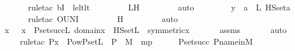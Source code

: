 \begin{isabellebody}
\ \ \ \ \ \ \isamarkupfalse%
{\isacharparenleft}{\kern0pt}rule{\isacharunderscore}{\kern0pt}tac\ b{\isacharequal}{\kern0pt}{\isachardoublequoteopen}{\isasymUnion}I{\isachardoublequoteclose}\ \ le{\isacharunderscore}{\kern0pt}lt{\isacharunderscore}{\kern0pt}lt{\isacharparenright}{\kern0pt}\ \isanewline
\ \ \ \ \ \ \isamarkupfalse%
\ LH\ \isanewline
\ \ \ \ \ \ \isamarkupfalse%
\ auto\ \isanewline
\ \ \ \ \isamarkupfalse%
\ \isamarkupfalse%
\ {\isachardoublequoteopen}y\ {\isasymin}\ {\isacharparenleft}{\kern0pt}{\isasymUnion}a\ {\isacharless}{\kern0pt}\ L{\isachardot}{\kern0pt}\ HS{\isacharunderscore}{\kern0pt}set{\isacharparenleft}{\kern0pt}a{\isacharparenright}{\kern0pt}{\isacharparenright}{\kern0pt}{\isachardoublequoteclose}\isanewline
\ \ \ \ \ \ \isamarkupfalse%
{\isacharparenleft}{\kern0pt}rule{\isacharunderscore}{\kern0pt}tac\ OUN{\isacharunderscore}{\kern0pt}I{\isacharparenright}{\kern0pt}\ \isanewline
\ \ \ \ \ \ \isamarkupfalse%
\ H\ \isanewline
\ \ \ \ \ \ \isamarkupfalse%
\ auto\isanewline
\ \ \isamarkupfalse%
\isanewline
\ \ \isamarkupfalse%
\ \isamarkupfalse%
\ {\isachardoublequoteopen}x\ {\isasymin}\ {\isacharbraceleft}{\kern0pt}\ x\ {\isasymin}\ P{\isacharunderscore}{\kern0pt}set{\isacharparenleft}{\kern0pt}succ{\isacharparenleft}{\kern0pt}L{\isacharparenright}{\kern0pt}{\isacharparenright}{\kern0pt}{\isachardot}{\kern0pt}\ domain{\isacharparenleft}{\kern0pt}x{\isacharparenright}{\kern0pt}\ {\isasymsubseteq}\ HS{\isacharunderscore}{\kern0pt}set{\isacharparenleft}{\kern0pt}L{\isacharparenright}{\kern0pt}\ {\isasymand}\ symmetric{\isacharparenleft}{\kern0pt}x{\isacharparenright}{\kern0pt}\ {\isacharbraceright}{\kern0pt}{\isachardoublequoteclose}\isanewline
\ \ \ \ \isamarkupfalse%
\ assms\ \isanewline
\ \ \ \ \isamarkupfalse%
\ auto\ \isanewline
\ \ \ \ \isamarkupfalse%
{\isacharparenleft}{\kern0pt}rule{\isacharunderscore}{\kern0pt}tac\ P{\isacharequal}{\kern0pt}{\isachardoublequoteopen}x\ {\isasymin}\ Pow{\isacharparenleft}{\kern0pt}P{\isacharunderscore}{\kern0pt}set{\isacharparenleft}{\kern0pt}L{\isacharparenright}{\kern0pt}\ {\isasymtimes}\ P{\isacharparenright}{\kern0pt}\ {\isasyminter}\ M{\isachardoublequoteclose}\ \ mp{\isacharparenright}{\kern0pt}\isanewline
\ \ \ \ \isamarkupfalse%
\ P{\isacharunderscore}{\kern0pt}set{\isacharunderscore}{\kern0pt}succ\ P{\isacharunderscore}{\kern0pt}name{\isacharunderscore}{\kern0pt}in{\isacharunderscore}{\kern0pt}M\ \isanewline

\end{isabellebody}
